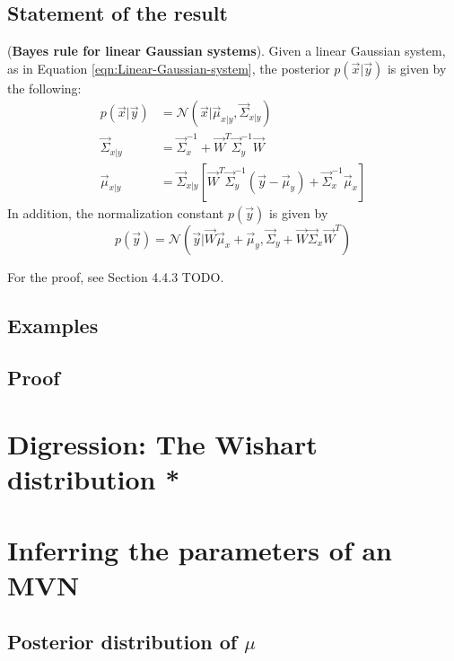 \subsection{Statement of the result}
\begin{theorem}(\textbf{Bayes rule for linear Gaussian systems}). 
Given a linear Gaussian system, as in Equation \ref{eqn:Linear-Gaussian-system}, the posterior $p(\vec{x}|\vec{y})$ is given by the following:
\begin{equation}\label{eqn:Linear-Gaussian-system-posterior}
  \boxed{\begin{split}
    p(\vec{x}|\vec{y})&=\mathcal{N}(\vec{x}|\vec{\mu}_{x|y},\vec{\Sigma}_{x|y}) \\
	\vec{\Sigma}_{x|y}&=\vec{\Sigma}_x^{-1}+\vec{W}^T\vec{\Sigma}_y^{-1}\vec{W} \\
	\vec{\mu}_{x|y}&=\vec{\Sigma}_{x|y}\left[\vec{W}^T\vec{\Sigma}_y^{-1}(\vec{y}-\vec{\mu}_y)+\vec{\Sigma}_x^{-1}\vec{\mu}_x\right]
  \end{split}}
\end{equation}
In addition, the normalization constant $p(\vec{y})$ is given by
\begin{equation}\label{eqn:Linear-Gaussian-system-normalizer}
  \boxed{
    p(\vec{y})=\mathcal{N}(\vec{y}|\vec{W}\vec{\mu}_x+\vec{\mu}_y,\vec{\Sigma}_y+\vec{W}\vec{\Sigma}_x\vec{W}^T)
  }
\end{equation}
\end{theorem}

For the proof, see Section 4.4.3 TODO.

\subsection{Examples}

\subsection{Proof}

\section{Digression: The Wishart distribution *}


\section{Inferring the parameters of an MVN}


\subsection{Posterior distribution of $\mu$}



